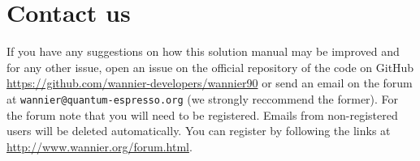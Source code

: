 \section*{Contact us}
\label{sec:contacts}

If you have any suggestions on how this solution manual may be improved and for any other issue, open an issue on the official repository of the \Wannier{} code on GitHub \url{https://github.com/wannier-developers/wannier90} or send an email on the forum at \newline \texttt{wannier@quantum-espresso.org} (we strongly reccommend the former). 
For the forum note that you will need to be registered. Emails from non-registered users will be deleted automatically. You can register by following the links at
\url{http://www.wannier.org/forum.html}.